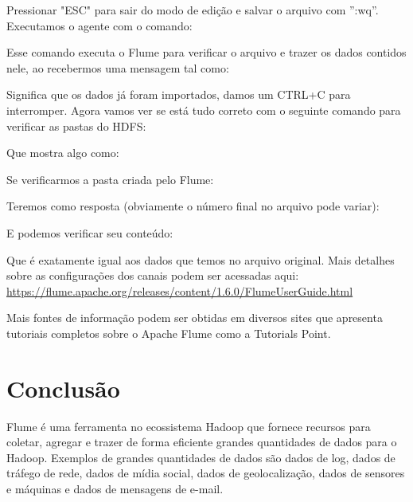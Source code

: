 \documentclass[a4paper,11pt]{article}
\begin{document}
Pressionar "ESC" para sair do modo de edição e salvar o arquivo com ”:wq”. Executamos o agente com o comando: \\

Esse comando executa o Flume para verificar o arquivo e trazer os dados contidos nele, ao recebermos uma mensagem tal como:

Significa que os dados já foram importados, damos um CTRL+C para interromper. Agora vamos ver se está tudo correto com o seguinte comando para verificar as pastas do HDFS: \\

Que mostra algo como: \\

Se verificarmos a pasta criada pelo Flume: \\

Teremos como resposta (obviamente o número final no arquivo pode variar): \\

E podemos verificar seu conteúdo: \\

Que é exatamente igual aos dados que temos no arquivo original. Mais detalhes sobre as configurações dos canais podem ser acessadas aqui: \url{	https://flume.apache.org/releases/content/1.6.0/FlumeUserGuide.html}

Mais fontes de informação podem ser obtidas em diversos sites que apresenta tutoriais completos sobre o Apache Flume como a Tutorials Point\cite{tutorialspoint}.
	
\section{Conclusão}
Flume é uma ferramenta no ecossistema Hadoop que fornece recursos para coletar, agregar e trazer de forma eficiente grandes quantidades de dados para o Hadoop. Exemplos de grandes quantidades de dados são dados de log, dados de tráfego de rede, dados de mídia social, dados de geolocalização, dados de sensores e máquinas e dados de mensagens de e-mail. 
\end{document}
